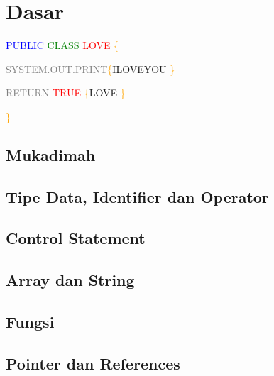 \documentclass[11pt,b5paper,oneside,titlepage]{book}
\begin{document}
\part{Dasar}

\begingroup
\thispagestyle{empty}
\par\normalfont\fontsize{25}{25}\sffamily\selectfont

\textcolor{blue}{PUBLIC} \textcolor{green}{CLASS} \textcolor{red}{LOVE} \textcolor{orange}{\{}

\textcolor{gray}{SYSTEM.OUT.PRINT}\textcolor{orange}{\{}ILOVEYOU \textcolor{orange}{\}}

\textcolor{gray}{RETURN} \textcolor{red}{TRUE} \textcolor{orange}{\{}LOVE \textcolor{orange}{\}}

\textcolor{orange}{\}}

\endgroup

	\chapter{Mukadimah}\label{mukadimah}
	
	
	\chapter{Tipe Data, Identifier dan Operator}
	
	
	\chapter{Control Statement}
	
	
	\chapter{Array dan String}\label{array-dan-string}
	
	
	\chapter{Fungsi}
	
	
	\chapter{Pointer dan References}\label{pointer-dan-references}
	
\end{document}
